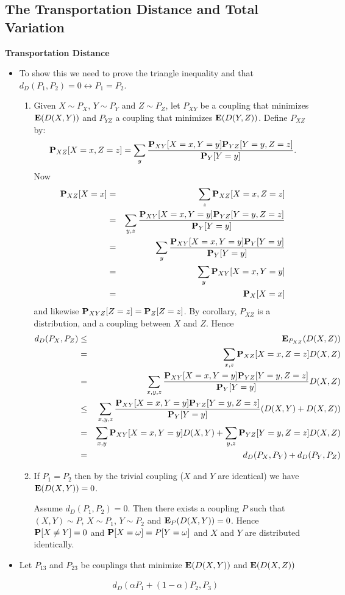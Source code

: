 \documentclass[11pt]{article} \usepackage{amssymb}
\newcommand{\E}{{\bf E}} \newcommand{\Cov}{{\bf Cov}}
\begin{document}
\subsection{The Transportation Distance and Total Variation}
{\bf Transportation Distance}
\begin{itemize}
\item To show this we need to prove the triangle inequality and that
  $d_D(P_1,P_2)=0 \leftrightarrow P_1=P_2$.
  \begin{enumerate}
  \item Given $X\sim P_X$, $Y\sim P_Y$ and $Z\sim P_Z$, let $P_{XY}$ be
    a coupling that minimizes $\E(D(X,Y))$ and $P_{YZ}$ a coupling that
    minimizes $\E(D(Y,Z))$. Define $P_{XZ}$ by:
    $$\P_{XZ}[X=x,Z=z]=\sum_y{\P_{XY}[X=x,Y=y]\P_{YZ}[Y=y,Z=z]\over \P_Y[Y=y]}.$$ 
    Now 
    \begin{eqnarray*}
      \P_{XZ}[X=x]&=&\sum_z\P_{XZ}[X=x,Z=z]
      \\ &=& \sum_{y,z}{\P_{XY}[X=x,Y=y]\P_{YZ}[Y=y,Z=z]\over \P_Y[Y=y]}
      \\ &=& \sum_{y}{\P_{XY}[X=x,Y=y]\P_{Y}[Y=y]\over \P_Y[Y=y]}
      \\ &=& \sum_{y}\P_{XY}[X=x,Y=y]
      \\ &=& \P_X[X=x]
    \end{eqnarray*}
    and likewise $\P_{XYZ}[Z=z]=\P_Z[Z=z]$. By corollary, $P_{XZ}$ is a
    distribution, and a coupling between $X$ and $Z$. Hence 
    \begin{eqnarray*}
      d_D(P_X,P_Z)&\leq& \E_{P_{XZ}}(D(X,Z)) 
      \\ &=& \sum_{x,z}\P_{XZ}[X=x,Z=z]D(X,Z)
      \\ &=& \sum_{x,y,z}{\P_{XY}[X=x,Y=y]\P_{YZ}[Y=y,Z=z]\over \P_Y[Y=y]}D(X,Z)
      \\ &\leq&\sum_{x,y,z}{\P_{XY}[X=x,Y=y]\P_{YZ}[Y=y,Z=z]\over \P_Y[Y=y]}(D(X,Y)+D(X,Z))
      \\ &=&\sum_{x,y}\P_{XY}[X=x,Y=y]D(X,Y)+\sum_{y,z}\P_{YZ}[Y=y,Z=z]D(X,Z)
      \\ &=&d_D(P_X,P_Y)+d_D(P_Y,P_Z)
    \end{eqnarray*}
    
  \item If $P_1=P_2$ then by the trivial coupling ($X$ and $Y$ are identical)
    we have $\E(D(X,Y))=0$. 

    Assume $d_D(P_1,P_2)=0$. Then there exists a coupling $P$ such that  
    $(X,Y)\sim P$,
    $X\sim P_1$, $Y\sim P_2$ and $\E_P(D(X,Y))=0$. Hence $\P[X\neq Y]=0$ and
    $\P[X=\omega]=P[Y=\omega]$ and $X$ and $Y$ are distributed identically.
  \end{enumerate}
  \item 
    Let $P_{13}$ and $P_{23}$ be couplings that minimize $\E(D(X,Y))$ and
    $\E(D(X,Z))$ 

    \begin{eqnarray*}
      d_D(\alpha P_1 +(1-\alpha)P_2,P_3)
    \end{eqnarray*}
\end{itemize}
\end{document}
